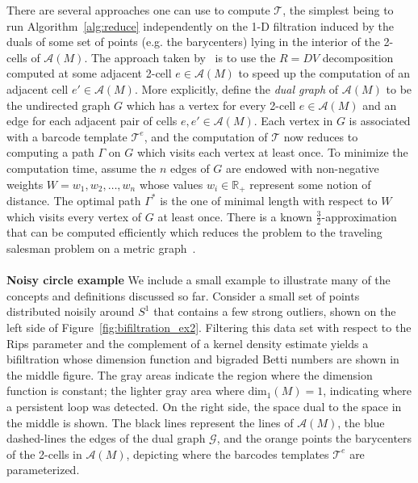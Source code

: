 \documentclass{siamart190516}
\begin{document}
There are several approaches one can use to compute $\mathcal{T}$, the simplest being to run Algorithm~\ref{alg:reduce} independently on the 1-D filtration induced by the duals of some set of points (e.g. the barycenters) lying in the interior of the 2-cells of $\mathcal{A}(M)$.  
The approach taken by~\cite{lesnick2015interactive} is to use the $R = DV$ decomposition computed at some adjacent 2-cell $e \in \mathcal{A}(M)$ to speed up the computation of an adjacent cell $e' \in \mathcal{A}(M)$. More explicitly, define the \emph{dual graph} of $\mathcal{A}(M)$ to be the undirected graph $G$ which has a vertex for every 2-cell $e \in \mathcal{A}(M)$ and an edge for each adjacent pair of cells $e, e' \in \mathcal{A}(M)$.
Each vertex in $G$ is associated with a barcode template $\mathcal{T}^e$, and the computation of $\mathcal{T}$ now reduces to computing a path $\Gamma$ on $G$ which visits each vertex at least once. To minimize the computation time, assume the $n$ edges of $G$ are endowed with non-negative weights $W = w_1, w_2, \dots, w_n$ whose values $w_i \in \mathbb{R}_{+}$ represent some notion of distance. The optimal path $\Gamma^\ast$ is the one of minimal length with respect to $W$ which visits every vertex of $G$ at least once. There is a known $\frac{3}{2}$-approximation that can be computed efficiently which reduces the problem to the traveling salesman problem on a metric graph~\cite{christofides1976worst}.
\\
\\
\textbf{Noisy circle example} We include a small example to illustrate many of the concepts and definitions discussed so far. 
Consider a small set of points distributed noisily around $S^1$ that contains a few strong outliers, shown on the left side of Figure~\ref{fig:bifiltration_ex2}. Filtering this data set with respect to the Rips parameter and the complement of a kernel density estimate yields a bifiltration whose dimension function and bigraded Betti numbers are shown in the middle figure. The gray areas indicate the region where the dimension function is constant; the lighter gray area where $\mathrm{dim}_1(M) = 1$, indicating where a persistent loop was detected.
On the right side, the space dual to the space in the middle is shown. The black lines represent the lines of $\mathcal{A}(M)$, the blue dashed-lines the edges of the dual graph $\mathcal{G}$, and the orange points the barycenters of the 2-cells in $\mathcal{A}(M)$, depicting where the barcodes templates $\mathcal{T}^e$ are parameterized. 
\end{document}
